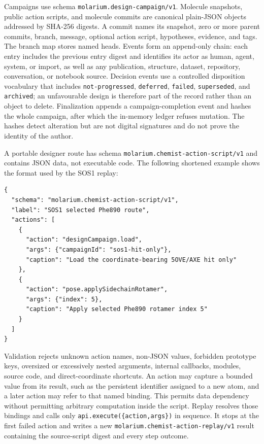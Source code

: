 Campaigns use schema \texttt{molarium.design-campaign/v1}.
Molecule snapshots, public action scripts, and molecule commits are canonical
plain-JSON objects addressed by SHA-256 digests.
A commit names its snapshot, zero or more parent commits, branch, message,
optional action script, hypotheses, evidence, and tags.
The branch map stores named heads.
Events form an append-only chain: each entry includes the previous entry digest
and identifies its actor as human, agent, system, or import, as well as any
publication, structure, dataset, repository, conversation, or notebook source.
Decision events use a controlled disposition vocabulary that includes
\texttt{not-progressed}, \texttt{deferred}, \texttt{failed},
\texttt{superseded}, and \texttt{archived}; an unfavourable design is therefore
part of the record rather than an object to delete.
Finalization appends a campaign-completion event and hashes the whole campaign,
after which the in-memory ledger refuses mutation.
The hashes detect alteration but are not digital signatures and do not prove
the identity of the author.

A portable designer route has schema
\texttt{molarium.chemist-action-script/v1} and contains JSON data, not
executable code.
The following shortened example shows the format used by the SOS1 replay:

\begin{verbatim}
{
  "schema": "molarium.chemist-action-script/v1",
  "label": "SOS1 selected Phe890 route",
  "actions": [
    {
      "action": "designCampaign.load",
      "args": {"campaignId": "sos1-hit-only"},
      "caption": "Load the coordinate-bearing 5OVE/AXE hit only"
    },
    {
      "action": "pose.applySidechainRotamer",
      "args": {"index": 5},
      "caption": "Apply selected Phe890 rotamer index 5"
    }
  ]
}
\end{verbatim}

Validation rejects unknown action names, non-JSON values, forbidden prototype
keys, oversized or excessively nested arguments, internal callbacks, modules,
source code, and direct-coordinate shortcuts.
An action may capture a bounded value from its result, such as the persistent
identifier assigned to a new atom, and a later action may refer to that named
binding.
This permits data dependency without permitting arbitrary computation inside
the script.
Replay resolves those bindings and calls only
\texttt{api.execute(\{action,args\})} in sequence.
It stops at the first failed action and writes a new
\texttt{molarium.chemist-action-replay/v1} result containing the source-script
digest and every step outcome.

